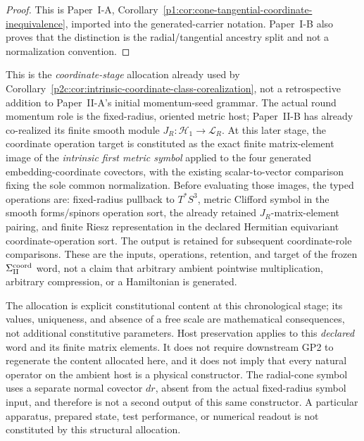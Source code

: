 \documentclass[12pt,a4paper]{article}
\begin{document}
\begin{proof}
This is Paper~I-A,
Corollary~\ref{p1:cor:cone-tangential-coordinate-inequivalence}, imported into
the generated-carrier notation.  Paper~I-B also proves that the distinction is
the radial/tangential ancestry split and not a normalization convention.
\end{proof}

\begin{remark}
\label{p2c:rem:v265-coordinate-constitution-boundary}
This is the \emph{coordinate-stage} allocation already used by
Corollary~\ref{p2c:cor:intrinsic-coordinate-class-corealization}, not a
retrospective addition to Paper~II-A's initial momentum-seed grammar.
The actual round momentum role is the fixed-radius, oriented metric host;
Paper~II-B has already co-realized its finite smooth module
\(J_R:\mathcal H_1\to\mathcal L_R\).  At this later stage, the coordinate
operation target is constituted as the exact finite matrix-element image of
the \emph{intrinsic first metric symbol} applied to the four generated
embedding-coordinate covectors, with the existing scalar-to-vector comparison
fixing the sole common normalization.  Before evaluating those images, the
typed operations are: fixed-radius pullback to \(T^*S^3\), metric Clifford
symbol in the smooth forms/spinors operation sort, the already retained
\(J_R\)-matrix-element pairing, and finite Riesz representation in the
declared Hermitian equivariant coordinate-operation sort.  The output is
retained for subsequent coordinate-role comparisons.  These are the inputs,
operations, retention, and target of the frozen \(\Sigma_{\rm II}^{\rm coord}\)
word, not a claim that arbitrary ambient pointwise multiplication, arbitrary
compression, or a Hamiltonian is generated.

The allocation is explicit constitutional content at this chronological
stage; its values, uniqueness, and absence of a free scale are mathematical
consequences, not additional constitutive parameters.  Host preservation
applies to this \emph{declared} word and its finite matrix elements.  It does
not require downstream GP2 to regenerate the content allocated here, and it
does not imply that every natural operator on the ambient host is a physical
constructor.  The radial-cone symbol uses a separate normal covector
\(dr\), absent from the actual fixed-radius symbol input, and therefore
is not a second output of this same constructor.  A particular apparatus,
prepared state, test performance, or numerical readout is not constituted by
this structural allocation.
\end{remark}
\end{document}
